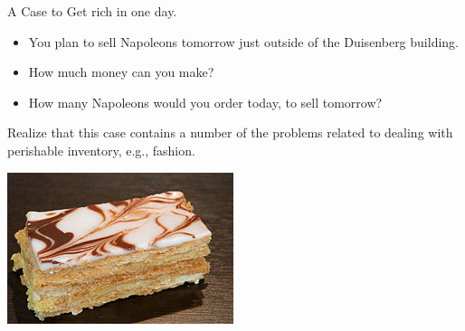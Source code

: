 \begin{question} A Case to  Get rich in one day. 

  \begin{itemize}
  \item You plan to sell Napoleons tomorrow just outside of the
    Duisenberg building.
  \item How much money can you make? 
  \item How many Napoleons would you order today, to sell tomorrow?
  \end{itemize}
  Realize that this case contains a number of the problems related to
  dealing with perishable inventory, e.g., fashion. 

   \includegraphics[scale = 1.0]{figures/mille-feuille}


\end{question}
